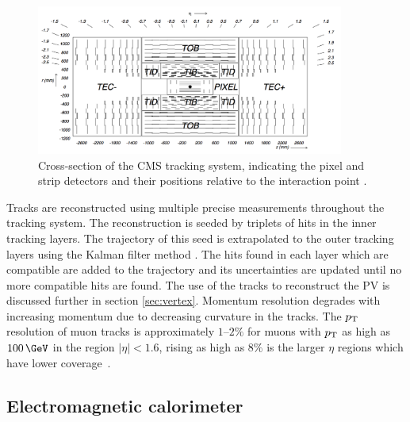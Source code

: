 \begin{figure}[htbp]
   \includegraphics[width=0.9\textwidth]{plots/detector/tracker_layout.png}
\caption[Cross-section of the CMS tracking system, indicating the pixel and
strip detectors and their positions relative to the interaction point.]
{Cross-section of the CMS tracking system, indicating the pixel and
strip detectors and their positions relative to the interaction point \cite{Chatrchyan:2008aa}.}
\label{fig:trackerlayout}
\end{figure}

Tracks are reconstructed using multiple precise measurements throughout the
tracking system. The reconstruction is seeded by triplets of hits in the inner
tracking layers. The trajectory of this seed is extrapolated to the outer tracking
layers using the Kalman filter method \cite{Fruhwirth:1987fm}. The hits found in each layer
which are compatible are added to the trajectory and its uncertainties are
updated until no more compatible hits are found. The use of the tracks to
reconstruct the \ac{PV} is discussed further in section \ref{sec:vertex}.
Momentum resolution degrades with increasing momentum due to decreasing
curvature in the tracks. The $p_{\mathrm{T}}$ resolution of muon tracks is approximately
$1$--$2\%$ for muons with $p_{\mathrm{T}}$ as high as $100\,\GeV$ in the region
$|\eta|<1.6$, rising as high as $8\%$ is the larger $\eta$ regions which have
lower coverage~\cite{Chatrchyan:2008aa}.  

\subsection{Electromagnetic calorimeter}
\label{sec:ecal}

